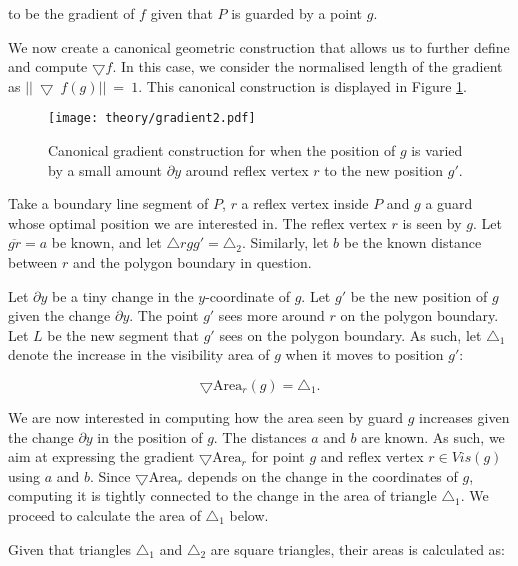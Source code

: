 to be the gradient of $f$ given that $P$ is guarded by a point $g$. 

We  now create a canonical geometric construction that allows us to further define and compute $\bigtriangledown f$. In this case, we consider the normalised length of the gradient as $||~\bigtriangledown~f(g)||~=~1$. This canonical construction is displayed in Figure \ref{fig:gradient}. 

\begin{figure}[h!]
    \centering
    \texttt{[image: theory/gradient2.pdf]}
    \caption{Canonical gradient construction for when the position of $g$ is varied by a small amount $\partial y$ around reflex vertex $r$ to the new position $g'$.}
    \label{fig:gradient}
\end{figure}

Take a boundary line segment of $P$, $r$ a reflex vertex inside $P$ and $g$ a guard whose optimal position we are interested in. The reflex vertex $r$ is seen by $g$. Let $\overline{gr} = a$ be known, and let $\triangle rgg' = \triangle_2$. Similarly, let $b$ be the known distance between $r$ and the polygon boundary in question.


Let $\partial y$ be a tiny change in the $y$-coordinate of $g$. Let $g'$ be the new position of $g$ given the change $\partial y$. The point $g'$ sees more around $r$ on the polygon boundary. Let $L$ be the new segment that $g'$ sees on the polygon boundary. As such, let $\triangle_1$ denote the increase in the visibility area of $g$ when it moves to position $g'$:

\begin{equation}
    \bigtriangledown \text{Area}_r(g) = \triangle_1. \label{eq:derivative}
\end{equation}

We are now interested in computing how the area seen by guard $g$ increases given the change $\partial y$ in the position of $g$. The distances $a$ and $b$ are known. As such, we aim at expressing the gradient $\bigtriangledown \text{Area}_r$ for point $g$ and reflex vertex $r \in \mathit{Vis}(g)$ using $a$ and $b$. Since $\bigtriangledown \text{Area}_r$ depends on the change in the coordinates of $g$, computing it is tightly connected to the change in the area of triangle $\triangle_1$. We  proceed to calculate the area of $\triangle_1$ below.

Given that triangles $\triangle_1$ and $\triangle_2$ are square triangles, their areas is calculated as:

